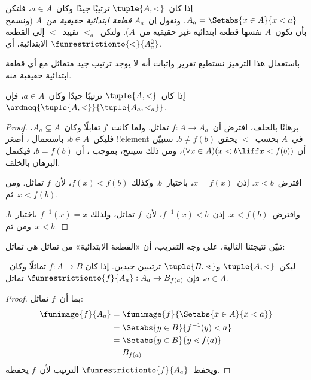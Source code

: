 \documentclass[../../../include/open-logic-section]{subfiles}
\begin{document}
\begin{defn}
إذا كان~$\tuple{A, <}$ ترتيبًا جيدًا وكان~$a \in A$، فلتكن
$A_a = \Setabs{x \in A}{x < a}$. ونقول إن~$A_a$ \emph{قطعة
ابتدائية حقيقية} من~$A$ (ونسمح بأن تكون~$A$ نفسها قطعة ابتدائية غير
حقيقية من~$A$). ولتكن~$<_a$ تقييد~$<$ إلى القطعة الابتدائية، أي
$\funrestrictionto{\mathord{<}}{A_a^2}$.
\end{defn}
\noindent
باستعمال هذا الترميز نستطيع تقرير وإثبات أنه لا يوجد ترتيب جيد متماثل
مع أي قطعة ابتدائية حقيقية منه.

\begin{lem}
إذا كان~$\tuple{A, <}$ ترتيبًا جيدًا وكان~$a \in A$، فإن
$\ordneq{\tuple{A, <}}{\tuple{A_a, <_a}}$.
\end{lem}

\begin{proof}
برهانًا بالخلف، افترض أن~$f \colon A \to A_a$ تماثل. ولما كانت~$f$
تقابلًا وكان~$A_a \subsetneq A$، فليكن~$b \in A$، باستعمال
، أصغر !!{element} في~$A$ بحسب~$<$ يحقق
$b \neq f(b)$. سنبيّن أن
$(\forall x \in A)(x<b \liff x < f(b))$، ومن ذلك سينتج، بموجب
، أن
$b = f(b)$، فيكتمل البرهان بالخلف.

افترض~$x < b$. إذن~$x = f(x)$، باختيار~$b$. وكذلك
$f(x) < f(b)$، لأن~$f$ تماثل. ومن ثم~$x < f(b)$.

وافترض~$x < f(b)$. إذن~$f^{-1}(x) < b$، لأن~$f$ تماثل، ولذلك
$f^{-1}(x) = x$ باختيار~$b$. ومن ثم~$x < b$.
\end{proof}

تبيّن نتيجتنا التالية، على وجه التقريب، أن «القطعة الابتدائية» من
تماثل هي تماثل:

\begin{lem}
ليكن~$\tuple{A, <}$ و$\tuple{B, \lessdot}$ ترتيبين جيدين. إذا كان
$f \colon A \to B$ تماثلًا وكان~$a \in A$، فإن
$\funrestrictionto{f}{A_{a}} : A_a \to B_{f(a)}$ تماثل.
\end{lem}

\begin{proof}
بما أن~$f$ تماثل:
\begin{align*}
	\funimage{f}{A_a} &= \funimage{f}{\Setabs{x \in A}{x < a}}\\
	&= \Setabs{y \in B}{f^{-1}(y)<a} \\
	&= \Setabs{y \in B}{y \lessdot f(a)} \\
	&=B_{f(a)} 
\end{align*}
ويحفظ~$\funrestrictionto{f}{A_a}$ الترتيب لأن~$f$ يحفظه.
\end{proof}
\end{document}
